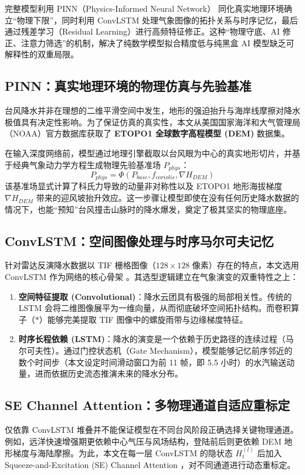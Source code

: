\documentclass[12pt,a4paper]{ctexart}
\begin{document}
完整模型利用 PINN（Physics-Informed Neural Network）\cite{pinn} 同化真实地理环境确立“物理下限”，同时利用 ConvLSTM 处理气象图像的拓扑关系与时序记忆，最后通过残差学习（Residual Learning）进行高频特征修正。这种“物理守底、AI 修正、注意力筛选”的机制，解决了纯数学模型拟合精度低与纯黑盒 AI 模型缺乏可解释性的双重局限。

\subsection{PINN：真实地理环境的物理仿真与先验基准}
台风降水并非在理想的二维平滑空间中发生，地形的强迫抬升与海岸线摩擦对降水极值具有决定性影响。为了保证仿真的真实性，本文从美国国家海洋和大气管理局（NOAA）官方数据库获取了 \textbf{ETOPO1 全球数字高程模型 (DEM)} 数据集。

在输入深度网络前，模型通过地理引擎截取以台风眼为中心的真实地形切片，并基于经典气象动力学方程生成物理先验基准场 $P_{phys}$：
\begin{equation}
    P_{phys} = \Phi\left( P_{base}, f_{coriolis}, \nabla H_{DEM} \right)
\end{equation}
该基准场显式计算了科氏力导致的动量非对称性以及 ETOPO1 地形海拔梯度 $\nabla H_{DEM}$ 带来的迎风坡抬升效应。这一步骤让模型即使在没有任何历史降水数据的情况下，也能“预知”台风撞击山脉时的降水爆发，奠定了极其坚实的物理底座。

\subsection{ConvLSTM：空间图像处理与时序马尔可夫记忆}
针对雷达反演降水数据以 TIF 栅格图像（$128 \times 128$ 像素）存在的特点，本文选用 ConvLSTM 作为网络的核心骨架 \cite{convlstm}。其选型逻辑建立在气象演变的双重特性之上：
\begin{enumerate}
    \item \textbf{空间特征提取 (Convolutional)}：降水云团具有极强的局部相关性。传统的 LSTM 会将二维图像展平为一维向量，从而彻底破坏空间拓扑结构。而卷积算子（$*$）能够完美提取 TIF 图像中的螺旋雨带与边缘梯度特征。
    \item \textbf{时序长程依赖 (LSTM)}：降水的演变是一个依赖于历史路径的连续过程（马尔可夫性）。通过门控状态机（Gate Mechanism），模型能够记忆前序邻近的数个时间步（本文设定时间滑动窗口为前 11 帧，即 5.5 小时）的水汽输送动量，进而依据历史流态推演未来的降水分布。
\end{enumerate}

\subsection{SE Channel Attention：多物理通道自适应重标定}
仅依靠 ConvLSTM 堆叠并不能保证模型在不同台风阶段正确选择关键物理通道。例如，远洋快速增强期更依赖中心气压与风场结构，登陆前后则更依赖 DEM 地形梯度与海陆摩擦。为此，本文在每一层 ConvLSTM 的隐状态 $H_t^{(l)}$ 后加入 Squeeze-and-Excitation (SE) Channel Attention \cite{senet}，对不同通道进行动态重标定。
\end{document}
